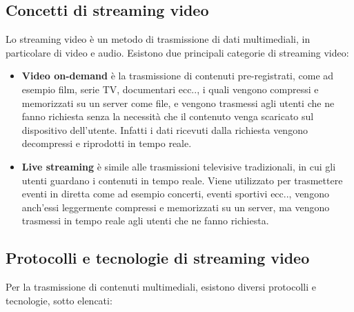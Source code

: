 \subsection{Concetti di streaming video}
Lo streaming video è un metodo di trasmissione di dati multimediali, in particolare di video e audio.
Esistono due principali categorie di streaming video:\\
\begin{itemize}
    \item \textbf{Video on-demand} è la trasmissione di contenuti pre-registrati, come ad esempio film, serie TV, documentari ecc.., i quali vengono compressi e memorizzati su un server come file,
    e vengono trasmessi agli utenti che ne fanno richiesta senza la necessità che il contenuto venga scaricato sul dispositivo dell'utente. Infatti i dati ricevuti dalla richiesta vengono decompressi e riprodotti in tempo reale.
    \item \textbf{Live streaming} è simile alle trasmissioni televisive tradizionali, in cui gli utenti guardano i contenuti in tempo reale. Viene utilizzato per trasmettere eventi in 
    diretta come ad esempio concerti, eventi sportivi ecc.., vengono anch'essi leggermente compressi e memorizzati su un server, ma vengono trasmessi in tempo reale agli utenti che ne fanno richiesta.
    \end{itemize}
\subsection{Protocolli e tecnologie di streaming video}
Per la trasmissione di contenuti multimediali, esistono diversi protocolli e tecnologie, sotto elencati:

